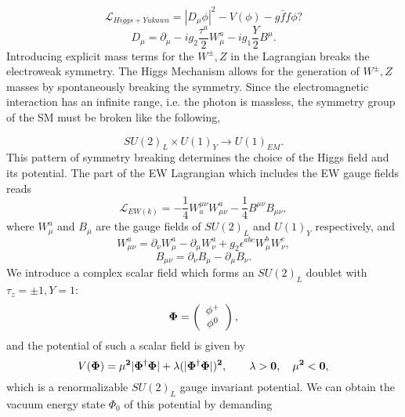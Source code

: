 \documentclass[secnumarabic, graphics,floatfix,nofootinbib,amsmath
tightenlines,nobibnotes,aps,prl,12pt]{revtex4-1}
\begin{document}
\begin{equation}
\mathcal{L}_{Higgs+Yukawa}=|D_{\mu}\phi|^2-V(\phi)-g\bar{f}f\phi?
\end{equation}
\begin{equation}
D_{\mu}=\partial_{\mu}-ig_2\frac{\tau^a}{2}W^a_{\mu}-ig_1\frac{Y}{2}B^{\mu}.
\end{equation}
Introducing explicit mass terms for the $W^{\pm},Z$ in the Lagrangian breaks the electroweak symmetry. The Higgs Mechanism allows for the generation of $W^{\pm},Z$ masses by spontaneously breaking the symmetry. Since the electromagnetic interaction has an infinite range, i.e. the photon is massless, the symmetry group of the SM must be broken like the following,



\begin{equation}
SU(2)_L\times U(1)_Y\to U(1)_{EM}.
\end{equation}
This pattern of symmetry breaking determines the choice of the Higgs field and its potential. The part of the EW Lagrangian which includes the EW gauge fields reads 
\begin{equation}
\mathcal{L}_{EW(k)}=-\frac{1}{4}W_a^{\mu\nu}W^a_{\mu\nu}-\frac{1}{4}B^{\mu\nu}B_{\mu\nu},
\end{equation}
where $W_{\mu}^a$ and $B_{\mu}$ are the gauge fields of $SU(2)_L$ and $U(1)_Y$ respectively, and
\begin{equation}
W_{\mu\nu}^a=\partial_{\nu}W_{\mu}^a-\partial_{\mu}W^{a}_{\nu}+g_2\epsilon^{abc}W_{\mu}^bW_{\nu}^c,
\end{equation}
\begin{equation}
B_{\mu\nu}=\partial_{\nu}B_{\mu}-\partial_{\mu}B_{\nu}.
\end{equation}
We introduce a complex scalar field which forms an $SU(2)_L$ doublet with $\tau_z=\pm 1,Y=1$:
\begin{equation}
\bf{\Phi}=\left(
\begin{array}{c}
 \phi ^+ \\
 \phi ^0 \\
\end{array}
\right),
\end{equation}
and the potential of such a scalar field is given by
\begin{equation}
V(\bf{\Phi})=\mu^2|\Phi^{\dagger}\Phi|+\lambda(|\Phi^{\dagger}\Phi|)^2,\qquad \lambda >0,\quad \mu^2<0,
\end{equation}
which is a renormalizable $SU(2)_L$ gauge invariant potential. We can obtain the vacuum energy state $\Phi_0$ of this potential by demanding
\end{document}
